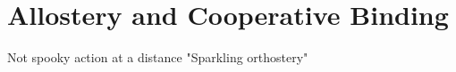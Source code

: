 \chapter{Allostery and Cooperative Binding}

Not spooky action at a distance
"Sparkling orthostery"
